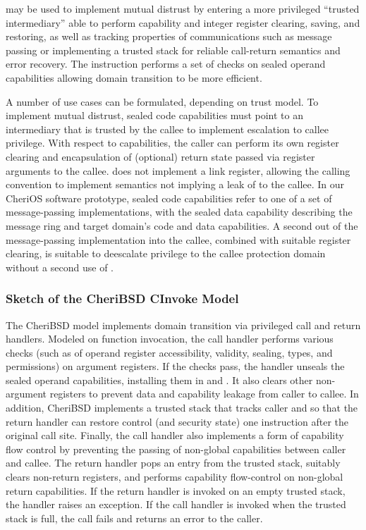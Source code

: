  may be used to implement mutual distrust by entering a more
privileged ``trusted intermediary'' able to perform capability and
integer register clearing, saving, and restoring, as well as tracking
properties of communications such as message passing or implementing a trusted
stack for reliable call-return semantics and error recovery.
The  instruction performs a set of checks on sealed
operand capabilities allowing
domain transition to be more efficient.

A number of use cases can be formulated, depending on trust
model.
To implement mutual distrust, sealed code capabilities must point to an
intermediary that is trusted by the callee to implement escalation to
callee privilege.
With respect to capabilities, the caller can perform its own register
clearing and encapsulation of (optional) return state passed via register
arguments to the callee.
 does not implement a link register, allowing the
calling convention
to implement semantics not implying a leak of \PCC{} to the callee.
In our CheriOS software prototype, sealed code capabilities refer to one of a
set of message-passing implementations, with the sealed data capability
describing the message ring and target domain's code and data capabilities.
A second  out of the message-passing implementation into the
callee, combined with suitable register clearing, is suitable to deescalate
privilege to the callee protection domain without a second use of
.

\subsubsection*{Sketch of the CheriBSD CInvoke Model}

The CheriBSD  model implements domain transition via
privileged call and return handlers.
Modeled on function invocation, the call handler performs various
checks (such as of operand register accessibility, validity, sealing, types,
and permissions) on argument registers.
If the checks pass, the handler unseals the sealed operand capabilities,
installing them in \PCC{} and \IDC{}.
It also clears other non-argument registers to prevent data and capability
leakage from caller to callee.
In addition, CheriBSD implements a trusted stack that tracks caller \PCC{} and
\IDC{} so that the return handler can restore control (and
security state) one instruction after the original call site.
Finally, the call handler also implements a form of capability flow
control by preventing the passing of non-global capabilities between caller
and callee.
The return handler pops an entry from the trusted stack, suitably clears
non-return registers, and performs capability flow-control on non-global return
capabilities.
If the return handler is invoked on an empty trusted stack,
the handler raises an exception.
If the call handler is invoked when the trusted stack is full,
the call fails and returns an error to the caller.

